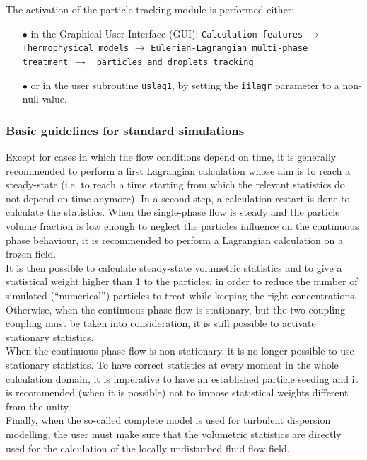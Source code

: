 {{The activation of the particle-tracking module is performed either:
%
\begin{itemize}
 \item [$\bullet$] in the Graphical User Interface (GUI): \texttt{Calculation features} $\rightarrow$ \texttt{Thermophysical models} $\rightarrow$ \texttt{Eulerian-Lagrangian multi-phase treatment}~$\rightarrow$ ~\texttt{particles and droplets tracking}
 \item [$\bullet$] or in the user subroutine \texttt{uslag1}, by setting the \texttt{iilagr} parameter to a non-null value.
\end{itemize}

\subsubsection{Basic guidelines for standard simulations}

Except for cases in which the flow conditions depend on time, it is generally recommended to perform a first Lagrangian calculation whose aim is to reach a steady-state (i.e. to reach a time starting from which the relevant statistics do not depend on time anymore). In a second step, a calculation restart is done to calculate the statistics. When the single-phase flow is steady and the particle volume fraction is low enough to neglect the particles influence on the continuous phase behaviour, it is recommended to perform a Lagrangian calculation on a frozen field.\\

It is then possible to calculate steady-state volumetric statistics and to give a statistical weight higher than 1 to the particles, in order to reduce the number of simulated (``numerical'') particles to treat while keeping the right concentrations. Otherwise, when the continuous phase flow is stationary, but the two-coupling coupling must be taken into consideration, it is still possible to activate stationary statistics. \\
When the continuous phase flow is non-stationary, it is no longer possible to use stationary statistics. To have correct statistics at every moment in the whole calculation domain, it is imperative to have an established particle seeding and it is recommended (when it is possible) not to impose statistical weights different from the unity. \\

Finally, when the so-called complete model is used for turbulent dispersion modelling, the user must make sure that the volumetric statistics are directly used for the calculation of the locally undisturbed fluid flow field.\\

}}
